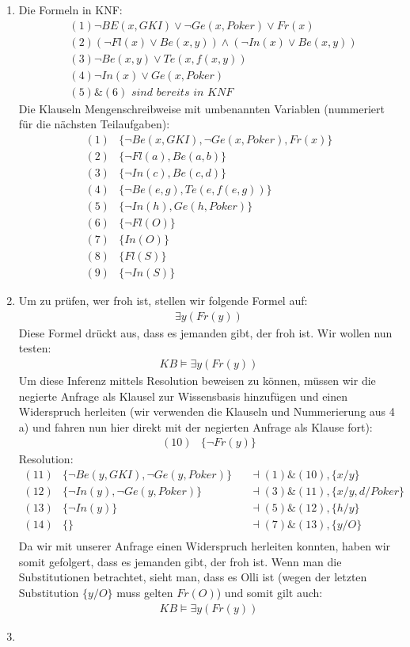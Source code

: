 \documentclass[a4paper,10pt]{article}
\begin{document}
\begin{enumerate}[~~a)]
    \item
Die Formeln in KNF:
\begin{align*}
&(1) \lnot BE(x,GKI) \lor \lnot Ge(x, Poker) \lor Fr(x)\\
&(2) (\lnot Fl(x) \lor Be(x,y)) \land (\lnot In(x) \lor Be(x,y))\\
&(3) \lnot Be(x,y) \lor Te(x,f(x,y))\\
&(4) \lnot In(x) \lor Ge(x, Poker)\\
&(5) \& (6) \textit{ sind bereits in KNF}
\end{align*}
Die Klauseln Mengenschreibweise mit umbenannten Variablen (nummeriert für die nächsten Teilaufgaben):
\begin{align*}
(1) &\{\lnot Be(x, GKI), \lnot Ge(x,Poker) , Fr(x) \}\\
(2) &\{\lnot Fl(a), Be(a,b)\}\\
(3) &\{ \lnot In(c), Be(c,d)\}\\
(4) &\{\lnot Be(e,g), Te(e,f(e,g))\}\\
(5) &\{\lnot In(h), Ge(h, Poker)\}\\
(6) &\{\lnot Fl(O)\}\\
(7) &\{In(O)\}\\
(8) &\{Fl(S)\}\\
(9) &\{\lnot In(S)\}
\end{align*}
    \item
Um zu prüfen, wer froh ist, stellen wir folgende Formel auf:
\begin{align*}
\exists y(Fr(y))
\end{align*}
Diese Formel drückt aus, dass es jemanden gibt, der froh ist. Wir wollen nun testen:
\begin{align*}
KB \vDash \exists y (Fr(y))
\end{align*}
Um diese Inferenz mittels Resolution beweisen zu können, müssen wir die negierte Anfrage als Klausel zur Wissensbasis hinzufügen und einen Widerspruch herleiten (wir verwenden die Klauseln und Nummerierung aus 4 a) und fahren nun hier direkt mit der negierten Anfrage als Klause fort):
\begin{align*}
(10) &\{\lnot Fr(y)\}
\end{align*}
Resolution:
\begin{align*}
(11) &\{\lnot Be(y, GKI), \lnot Ge(y,Poker)\} &&\dashv (1) \& (10), \{x/y\}\\
(12) &\{\lnot In(y),\lnot Ge(y,Poker)\} &&\dashv (3) \& (11), \{x/y,d/Poker\}\\
(13) &\{\lnot In(y)\} &&\dashv (5) \& (12), \{h/y\}\\
(14) &\{\} && \dashv (7) \& (13), \{y/O\}\\
\end{align*}
Da wir mit unserer Anfrage einen Widerspruch herleiten konnten, haben wir somit gefolgert, dass es jemanden gibt, der froh ist. Wenn man die Substitutionen betrachtet, sieht man, dass es Olli ist (wegen der letzten Substitution $\{y/O\}$ muss gelten $Fr(O)$) und somit gilt auch:
\begin{align*}
KB \vDash \exists y (Fr(y))
\end{align*}
    \item


\end{enumerate}
\end{document}

